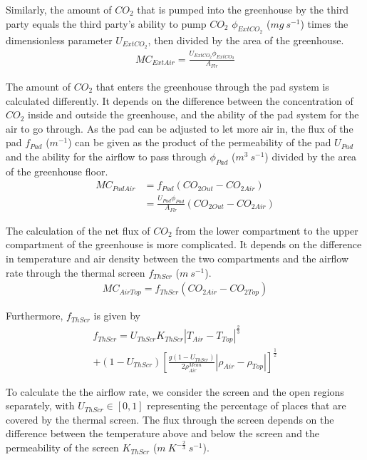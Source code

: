 \documentclass[a4paper]{article}
\numberwithin{equation}{section}
\begin{document}
Similarly, the amount of \(CO_2\) that is pumped into the greenhouse by the third party equals the third party's ability to pump \(CO_2\) \(\phi_{ExtCO_2}\) (\(mg\ s^{-1}\)) times the dimensionless parameter \(U_{ExtCO_2}\), then divided by the area of the greenhouse.
\begin{align}
  MC_{ExtAir} = \frac{U_{ExtCO_2}\phi_{ExtCO_2}}{A_{Flr}}
\end{align}

The amount of \(CO_2\) that enters the greenhouse through the pad system is calculated differently.
It depends on the difference between the concentration of \(CO_2\) inside and outside the greenhouse, and the ability of the pad system for the air to go through.
As the pad can be adjusted to let more air in, the flux of the pad \(f_{Pad}\) (\(m^{-1}\)) can be given as the product of the permeability of the pad \(U_{Pad}\) and the ability for the airflow to pass through \(\phi_{Pad}\) (\(m^3\ s^{-1}\)) divided by the area of the greenhouse floor.
\begin{equation}
  \begin{split}
    MC_{PadAir} & = f_{Pad} (CO_{2 Out} - CO_{2 Air}) \\
    & = \frac{U_{Pad} \phi_{Pad}}{A_{Flr}} (CO_{2 Out} - CO_{2 Air})
  \end{split}
\end{equation}

The calculation of the net flux of \(CO_2\) from the lower compartment to the upper compartment of the greenhouse is more complicated.
It depends on the difference in temperature and air density between the two compartments and the airflow rate through the thermal screen \(f_{ThScr}\) (\(m\ s^{-1}\)).
\begin{align}
  MC_{AirTop} = f_{ThScr} (CO_{2 Air} - CO_{2 Top})
\end{align}

Furthermore, \(f_{ThScr}\) is given by
\begin{multline}
  f_{ThScr} = U_{ThScr} K_{ThScr} |T_{Air} - T_{Top}|^{\frac{2}{3}} \\
  + (1 - U_{ThScr}) {\left[\frac{g(1 - U_{ThScr})}{2\rho^{Mean}_{Air}} |\rho_{Air} - \rho_{Top}|\right]}^{\frac{1}{2}}
\end{multline}

To calculate the the airflow rate, we consider the screen and the open regions separately, with \(U_{ThScr} \in [0,1]\) representing the percentage of places that are covered by the thermal screen. The flux through the screen depends on the difference between the temperature above and below the screen and the permeability of the screen \(K_{ThScr}\) (\(m\ K^{-\frac{2}{3}}\ s^{-1}\)).
\end{document}

